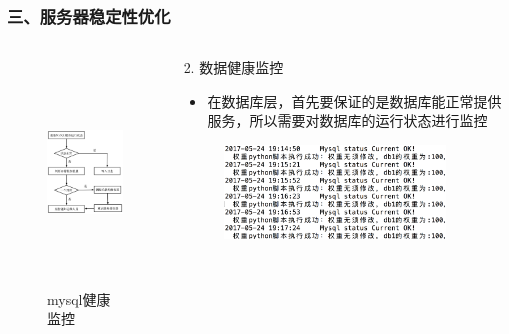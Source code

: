 \documentclass{beamer}
\begin{document}
\begin{frame}
\frametitle{三、服务器稳定性优化}
  \begin{columns}
    \begin{column}{0.50\textwidth}
      \begin{figure}
      \centering
        \includegraphics[height=6cm]{./img/mysql1.png}
        \caption{mysql健康监控}
        \label{fig:mysql1}
      \end{figure}
    \end{column}
    \begin{column}{0.50\textwidth}
      \begin{block}{2. 数据健康监控}
        \begin{itemize}
          \item \footnotesize{在数据库层，首先要保证的是数据库能正常提供服务，所以需要对数据库的运行状态进行监控}
        \end{itemize}
      \end{block}
      \begin{figure}
      \centering
        \includegraphics[height=2.5cm]{./img/03/sql1.png}
      \end{figure}
    \end{column}
  \end{columns}
\end{frame}
\end{document}
